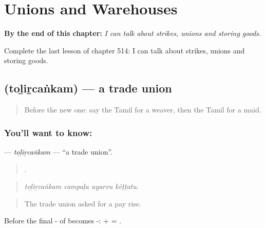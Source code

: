 
\chapter{Unions and Warehouses}
\label{ch:ta-unions-and-warehouses}

\begin{chapteropening}
\textbf{By the end of this chapter:} \emph{I can talk about strikes, unions and storing goods.}

Complete the last lesson of chapter 514: I can talk about strikes, unions and storing goods.
\end{chapteropening}

\section[\texorpdfstring{\ta{தொழிற்சங்கம்} (toḻiṟcaṅkam)}{தொழிற்சங்கம் (toḻiṟcaṅkam)}]{ (toḻiṟcaṅkam) — a trade union}

\label{lesson:TA-C514-tolircankam}



\begin{quote}
Before the new one: say the Tamil for a weaver, then the Tamil for a maid.
\end{quote}

\subsection*{You'll want to know: }
\textbf{} — \emph{toḻiṟcaṅkam} — \textquotedblleft{}a trade union\textquotedblright{}.

\begin{quote}
   .
\end{quote}

\begin{quote}
\emph{toḻiṟcaṅkam campaḷa uyarvu kēṭṭatu.}
\end{quote}

\begin{quote}
The trade union asked for a pay rise.
\end{quote}

Before  the final - of  becomes -:  +  = .

